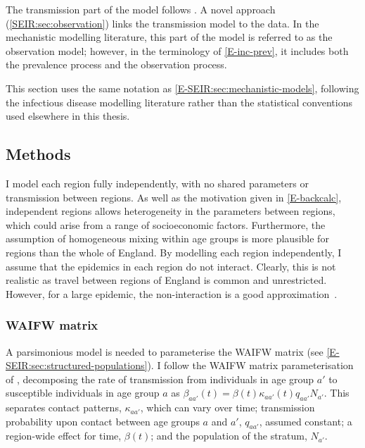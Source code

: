\documentclass[thesis.tex]{subfiles}
\begin{document}
The transmission part of the model follows \textcite{birrellRealtime}.
A novel approach (\cref{SEIR:sec:observation}) links the transmission model to the data.
In the mechanistic modelling literature, this part of the model is referred to as the observation model; however, in the terminology of \cref{E-inc-prev}, it includes both the prevalence process and the observation process.

This section uses the same notation as \cref{E-SEIR:sec:mechanistic-models}, following the infectious disease modelling literature rather than the statistical conventions used elsewhere in this thesis.

\subsection{Methods}


I model each region fully independently, \ie with no shared parameters or transmission between regions.
As well as the motivation given in \cref{E-backcalc}, independent regions allows heterogeneity in the parameters between regions, which could arise from a range of socioeconomic factors.
Furthermore, the assumption of homogeneous mixing within age groups is more plausible for regions than the whole of England.
By modelling each region independently, I assume that the epidemics in each region do not interact.
Clearly, this is not realistic as travel between regions of England is common and unrestricted.
However, for a large epidemic, the non-interaction is a good approximation~\autocite{birrellRealtimea}.

\subsubsection{WAIFW matrix}

A parsimonious model is needed to parameterise the WAIFW matrix (see \cref{E-SEIR:sec:structured-populations}).
I follow the WAIFW matrix parameterisation of \textcite{birrellRealtime}, decomposing the rate of transmission from individuals in age group $a'$ to susceptible individuals in age group $a$ as $\beta_{aa'}(t) = \beta(t) \kappa_{aa'}(t) q_{aa'} N_{a'}$.
This separates contact patterns, $\kappa_{aa'}$, which can vary over time; transmission probability upon contact between age groups $a$ and $a'$, $q_{aa'}$, assumed constant; a region-wide effect for time, $\beta(t)$; and the population of the stratum, $N_{a'}$.
\end{document}
